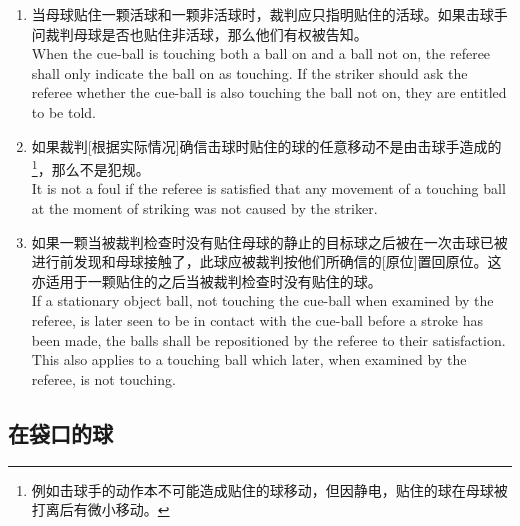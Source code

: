 \begin{enumerate}[label=(\alph*)]
    \item 当母球贴住一颗活球和一颗非活球时，裁判应只指明贴住的活球。如果击球手问裁判母球是否也贴住非活球，那么他们有权被告知。\\
    When the cue-ball is touching both a ball on and a ball not on, the referee shall only indicate the ball on as touching. If the striker should ask the referee whether the cue-ball is also touching the ball not on, they are entitled to be told.
    \item 如果裁判[根据实际情况]确信击球时贴住的球的任意移动不是由击球手造成的\footnote{例如击球手的动作本不可能造成贴住的球移动，但因静电，贴住的球在母球被打离后有微小移动。}，那么不是犯规。\\
    It is not a foul if the referee is satisfied that any movement of a touching ball at the moment of striking was not caused by the striker.
    \item 如果一颗当被裁判检查时没有贴住母球的静止的目标球之后被在一次击球已被进行前发现和母球接触了，此球应被裁判按他们所确信的[原位]置回原位。这亦适用于一颗贴住的之后当被裁判检查时没有贴住的球。\\
    If a stationary object ball, not touching the cue-ball when examined by the referee, is later seen to be in contact with the cue-ball before a stroke has been made, the balls shall be repositioned by the referee to their satisfaction. This also applies to a touching ball which later, when examined by the referee, is not touching.
\end{enumerate}

\subsection{在袋口的球}\label{2239}

